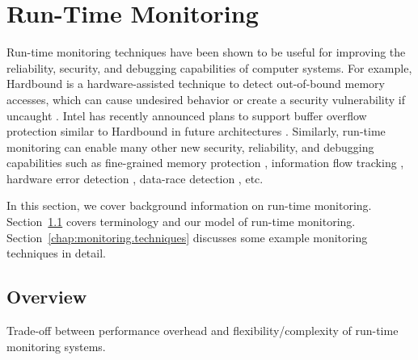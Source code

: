 \chapter{Run-Time Monitoring}
\label{chap:monitoring}

Run-time monitoring techniques have been shown to be useful for improving the
reliability, security, and debugging capabilities of computer systems. For
example, Hardbound is a hardware-assisted technique to detect out-of-bound
memory accesses, which can cause undesired behavior or create a security
vulnerability if uncaught \cite{hardbound-asplos08}.  Intel has recently
announced plans to support buffer overflow protection similar to Hardbound in
future architectures \cite{intel-mpx}. Similarly, run-time monitoring can
enable many other new security, reliability, and debugging capabilities such as
fine-grained memory protection \cite{mondrian-asplos02}, information flow
tracking \cite{dift-asplos04, testudo-micro08}, hardware error detection
\cite{argus-micro07}, data-race detection \cite{radish-isca12, cord-hpca06},
etc. 

In this section, we cover background information on run-time monitoring.
Section~\ref{chap:monitoring.overview} covers terminology and our model of
run-time monitoring. Section~\ref{chap:monitoring.techniques} discusses some
example monitoring techniques in detail.

\section{Overview}
\label{chap:monitoring.overview}


\begin{table}[t]
  \begin{center}
    \vspace{-0.0in}
    \begin{tiny}
    
    \end{tiny}
    \caption{Trade-off between performance overhead and flexibility/complexity of run-time monitoring systems.}
    \vspace{-0.2in}
    \label{tab:monitoring.previous_overheads}
  \end{center}
\end{table}

